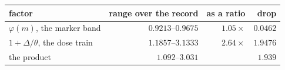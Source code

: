 \begin{tabular}{@{}lrrr@{}}
\toprule
\textbf{factor} & \textbf{range over the record} & \textbf{as a ratio} & \textbf{drop} \\
\midrule
$\varphi(m)$, the marker band & $0.9213$--$0.9675$ & $1.05\times$ & $0.0462$ \\
$1 + \Delta/\theta$, the dose train & $1.1857$--$3.1333$ & $2.64\times$ & $1.9476$ \\
the product & $1.092$--$3.031$ &  & $\mathbf{1.939}$ \\
\bottomrule
\end{tabular}
